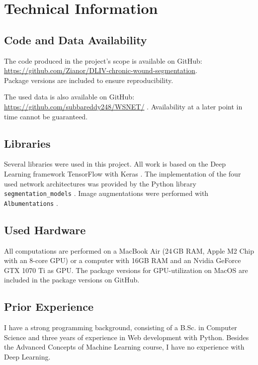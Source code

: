 \section{Technical Information}

\subsection{Code and Data Availability}

The code produced in the project's scope is available on GitHub:\\
	\url{https://github.com/Zianor/DLIV-chronic-wound-segmentation}.\\
	Package versions are included to ensure reproducibility.

The used data is also available on GitHub:
\url{https://github.com/subbareddy248/WSNET/} \cite{Oota_2021_WACV, Oota_2023_WACV}. Availability at a later point in time cannot be guaranteed.

\subsection{Libraries}

Several libraries were used in this project. All work is based on the Deep Learning framework TensorFlow with Keras \cite{tensorflow2015-whitepaper, chollet2015keras}. The implementation of the four used network architectures was provided by the Python library \texttt{segmentation\_models} \cite{SegmentationModels}. Image augmentations were performed with \texttt{Albumentations} \cite{albumentations}.

\subsection{Used Hardware}

All computations are performed on a MacBook Air (24\,GB RAM, Apple M2 Chip with an 8-core GPU) or a computer with 16GB RAM and an Nvidia GeForce GTX 1070 Ti as GPU. The package versions for GPU-utilization on MacOS are included in the package versions on GitHub.

\subsection{Prior Experience}

I have a strong programming background, consisting of a B.Sc. in Computer Science and three years of experience in Web development with Python. Besides the Advanced Concepts of Machine Learning course, I have no experience with Deep Learning.

